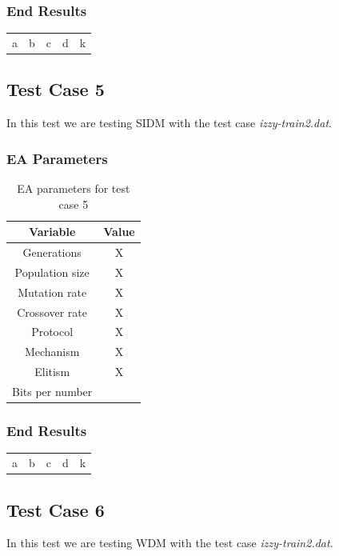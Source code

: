 \subsubsection{End Results}\label{sec:test-case-4-results}
\begin{table}
	\begin{tabular}{c c c c c}
		a & b & c & d & k \\
	\end{tabular}
\end{table}

\subsection{Test Case 5}\label{sec:test-case-5}
In this test we are testing SIDM with the test case
\textit{izzy-train2.dat}.
\subsubsection{EA Parameters}\label{sec:test-case-5-parameters}
\begin{table}
	\begin{tabular}{c c}
		Variable & Value \\
		\hline
		Generations & X \\
		\hline
		Population size & X \\
		\hline
		Mutation rate & X \\
		\hline
		Crossover rate & X \\
		\hline
		Protocol & X \\
		\hline
		Mechanism & X \\
		\hline
		Elitism & X \\
		\hline
		Bits per number & \\
	\end{tabular}
	\caption{EA parameters for test case 5}
\end{table}
\subsubsection{End Results}\label{sec:test-case-5-results}
\begin{table}
	\begin{tabular}{c c c c c}
		a & b & c & d & k \\
	\end{tabular}
\end{table}

\subsection{Test Case 6}\label{sec:test-case-6}
In this test we are testing WDM with the test case
\textit{izzy-train2.dat}.

